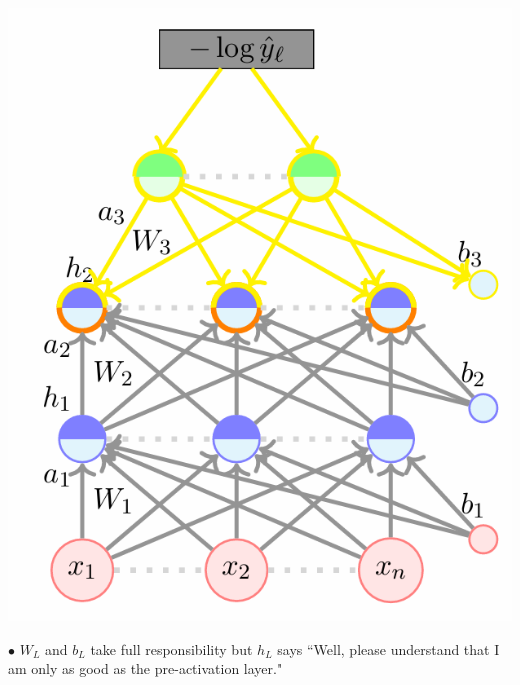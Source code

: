 \documentclass[11pt, a4paper]{article}
\begin{document}
\noindent
\begin{minipage}{0.45\textwidth}
    \includegraphics[scale = 0.49]{image_5.png}
\end{minipage}
\hfill
\begin{minipage}{0.5\textwidth}
    $\bullet$ $W_L$ and $b_L$ take full responsibility but $h_L$ says ``Well, please understand that I am only as good as the pre-activation layer."
\end{minipage}
\end{document}
